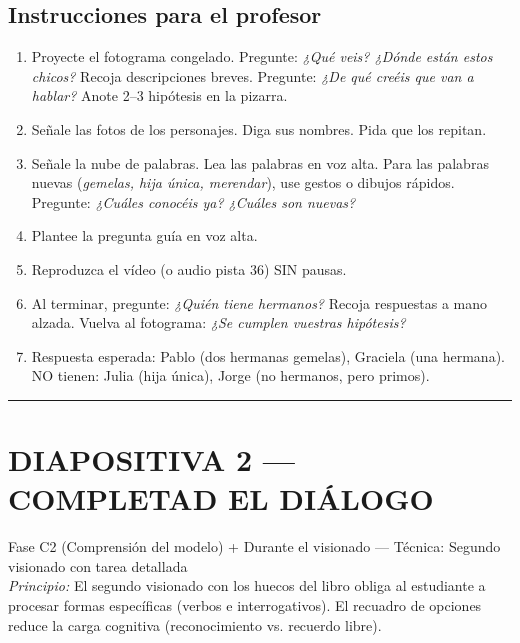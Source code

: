 \documentclass[a4paper,11pt]{article}
\begin{document}
\vspace{0.5cm}

\subsection*{Instrucciones para el profesor}

\begin{enumerate}[leftmargin=1.5cm, itemsep=4pt]
\item Proyecte el fotograma congelado. Pregunte: \textit{¿Qué veis? ¿Dónde están estos chicos?} Recoja descripciones breves. Pregunte: \textit{¿De qué creéis que van a hablar?} Anote 2--3 hipótesis en la pizarra.
\item Señale las fotos de los personajes. Diga sus nombres. Pida que los repitan.
\item Señale la nube de palabras. Lea las palabras en voz alta. Para las palabras nuevas (\textit{gemelas, hija única, merendar}), use gestos o dibujos rápidos. Pregunte: \textit{¿Cuáles conocéis ya? ¿Cuáles son nuevas?}
\item Plantee la pregunta guía en voz alta.
\item Reproduzca el vídeo (o audio pista 36) SIN pausas.
\item Al terminar, pregunte: \textit{¿Quién tiene hermanos?} Recoja respuestas a mano alzada. Vuelva al fotograma: \textit{¿Se cumplen vuestras hipótesis?}
\item Respuesta esperada: Pablo (dos hermanas gemelas), Graciela (una hermana). NO tienen: Julia (hija única), Jorge (no hermanos, pero primos).
\end{enumerate}

\newpage


\noindent\textcolor{violeta}{\rule{\linewidth}{2.5pt}}

\section*{DIAPOSITIVA 2 — COMPLETAD EL DIÁLOGO}

{\small Fase C2 (Comprensión del modelo) + Durante el visionado — Técnica: Segundo visionado con tarea detallada}\\
{\small\textit{Principio:} El segundo visionado con los huecos del libro obliga al estudiante a procesar formas específicas (verbos e interrogativos). El recuadro de opciones reduce la carga cognitiva (reconocimiento vs. recuerdo libre).}
\end{document}
